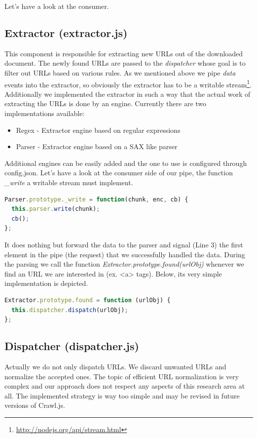 Let's have a look at the consumer.

\subsection{Extractor (extractor.js)}
This component is responsible for extracting new URLs out of the downloaded document. The newly found URLs are passed to the \emph{dispatcher} whose goal is to filter out URLs based on various rules. As we mentioned above we pipe \emph{data} events into the extractor, so obviously the extractor has to be a writable stream\footnote{\url{http://nodejs.org/api/stream.html}}. Additionally we implemented the extractor in such a way that the actual work of extracting the URLs is done by an engine. Currently there are two implementations available:
\begin{itemize}
  \item Regex - Extractor engine based on regular expressions
  \item Parser - Extractor engine based on a SAX like parser
\end{itemize}
Additional engines can be easily added and the one to use is configured through config.json. Let's have a look at the consumer side of our pipe, the function \emph{\_write} a writable stream must implement.

\begin{lstlisting}[language=JavaScript]
Parser.prototype._write = function(chunk, enc, cb) {
  this.parser.write(chunk);
  cb();
};
\end{lstlisting}

It does nothing but forward the data to the parser and signal (Line 3) the first element in the pipe (the request) that we successfully handled the data. During the parsing we call the function \emph{Extractor.prototype.found(urlObj)} whenever we find an URL we are interested in (ex. <a> tags). Below, its very simple implementation is depicted.

\begin{lstlisting}[language=JavaScript]
Extractor.prototype.found = function (urlObj) {
  this.dispatcher.dispatch(urlObj);
};
\end{lstlisting}

\subsection{Dispatcher (dispatcher.js)}
Actually we do not only dispatch URLs. We discard unwanted URLs and normalize the accepted ones. The topic of efficient URL normalization\cite{wiki:url_normalization} is very complex and our approach does not respect any aspects of this research area at all. The implemented strategy is way too simple and may be revised in future versions of Crawl.js.

